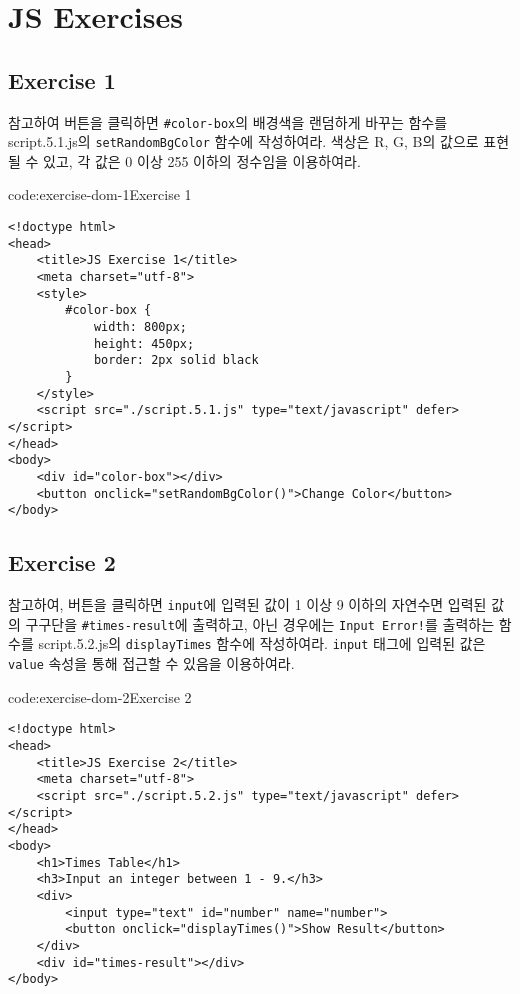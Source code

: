 \section{JS Exercises} \label{sect:js-exercises}

\subsection*{Exercise 1}

\을 참고하여 버튼을 클릭하면 \texttt{\#color-box}의 배경색을 랜덤하게 바꾸는 함수를 script.5.1.js의 \texttt{setRandomBgColor} 함수에 작성하여라. 색상은 R, G, B의 값으로 표현될 수 있고, 각 값은 0 이상 255 이하의 정수임을 이용하여라.

\begin{codeenv}{code:exercise-dom-1}{Exercise 1}\begin{verbatim}
<!doctype html>
<head>
    <title>JS Exercise 1</title>
    <meta charset="utf-8">
    <style>
        #color-box {
            width: 800px;
            height: 450px;
            border: 2px solid black
        }
    </style>
    <script src="./script.5.1.js" type="text/javascript" defer></script>
</head>
<body>
    <div id="color-box"></div>
    <button onclick="setRandomBgColor()">Change Color</button>
</body>
\end{verbatim}
\end{codeenv}

\subsection*{Exercise 2}

\를 참고하여, 버튼을 클릭하면 \texttt{input}에 입력된 값이 1 이상 9 이하의 자연수면 입력된 값의 구구단을 \texttt{\#times-result}에 출력하고, 아닌 경우에는 \texttt{Input Error!}를 출력하는 함수를 script.5.2.js의 \texttt{displayTimes} 함수에 작성하여라. \texttt{input} 태그에 입력된 값은 \texttt{value} 속성을 통해 접근할 수 있음을 이용하여라.

\begin{codeenv}{code:exercise-dom-2}{Exercise 2}\begin{verbatim}
<!doctype html>
<head>
    <title>JS Exercise 2</title>
    <meta charset="utf-8">
    <script src="./script.5.2.js" type="text/javascript" defer></script>
</head>
<body>
    <h1>Times Table</h1>
    <h3>Input an integer between 1 - 9.</h3>
    <div>
        <input type="text" id="number" name="number">
        <button onclick="displayTimes()">Show Result</button>
    </div>
    <div id="times-result"></div>
</body>
\end{verbatim}
\end{codeenv}

